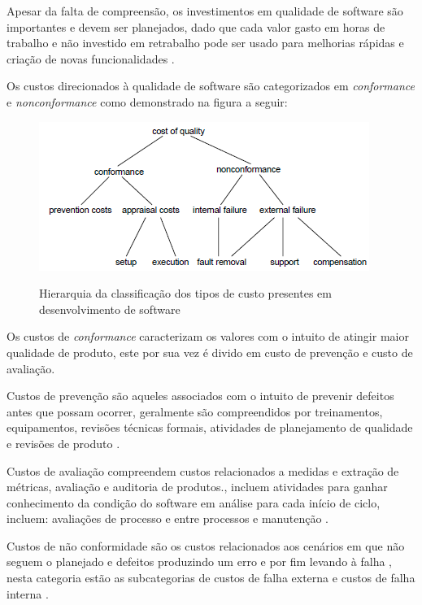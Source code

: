 \documentclass[
	12pt,				%
	oneside,			%
	a4paper,			%
	english,			%
	brazil				%
	]{abntex2ppgsi}
\begin{document}
Apesar da falta de compreensão, os investimentos em qualidade de software são importantes e devem ser planejados, dado que cada valor gasto em horas de trabalho e não investido em retrabalho pode ser usado para melhorias rápidas e criação de novas funcionalidades \cite{slaughter1998}.

Os custos direcionados à qualidade de software são categorizados em \textit{conformance} e \textit{nonconformance} \cite{ slaughter1998}\cite{pressman2009engenharia} como demonstrado na figura a seguir: 

\begin{figure}[H]%
	\centering
 	  \caption{Hierarquia da classificação dos tipos de custo presentes em desenvolvimento de software}
		\includegraphics{tipos-custo-arvore.png}
	\label{fig:tipos-custo-arvore}
\end{figure}

Os custos de \textit{conformance} caracterizam os valores com o intuito de atingir maior qualidade de produto, este por sua vez é divido em custo de prevenção e custo de avaliação. \cite{ wagner2005}

Custos de prevenção são aqueles associados com o intuito de prevenir defeitos antes que possam ocorrer, geralmente são compreendidos por treinamentos, equipamentos, revisões técnicas formais, atividades de planejamento de qualidade e revisões de produto \cite{wagner2005} \cite{pressman2009engenharia}.

Custos de avaliação compreendem custos relacionados a medidas e extração de métricas, avaliação e auditoria de produtos.\cite{wagner2005}, incluem atividades para ganhar conhecimento da condição do software em análise para cada início de ciclo, incluem: avaliações de processo e entre processos e manutenção \cite{pressman2009engenharia}.

Custos de não conformidade são os custos relacionados aos cenários em que não seguem o planejado e defeitos produzindo um erro e por fim levando à falha \cite{wagner2005}, nesta categoria estão as subcategorias de custos de falha externa e custos de falha interna \cite{pressman2009engenharia}. 
\end{document}
